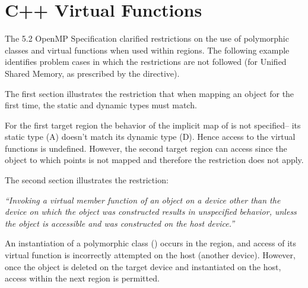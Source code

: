 \pagebreak
\section{C++ Virtual Functions}
\label{sec:virtual_functions}


The 5.2 OpenMP Specification clarified restrictions on the use 
of polymorphic classes and virtual functions when used within 
 regions.  The following example identifies 
problem cases in which the restrictions are not followed
(for Unified Shared Memory, as prescribed by the 
directive).

The first section illustrates the restriction
that when mapping an object for the first time, 
the static and dynamic types must match.

For the first target region the behavior of the implicit map of  
is not specified-- its static type (A) doesn't match its dynamic type (D).  
Hence access to the virtual functions is undefined.
However, the second target region can access  
since the object to which  points is not mapped and 
therefore the restriction does not apply.

The second section illustrates the restriction:

\emph{``Invoking a virtual member function of an object on a device other than the device on which the
object was constructed results in unspecified behavior, unless the object is accessible and was
constructed on the host device.''}

An instantiation of a polymorphic class () occurs in the 
 region, and access of its virtual function
is incorrectly attempted on the host (another device).
However, once the object is deleted on
the target device and instantiated on the host, access within
the next  region is permitted.

